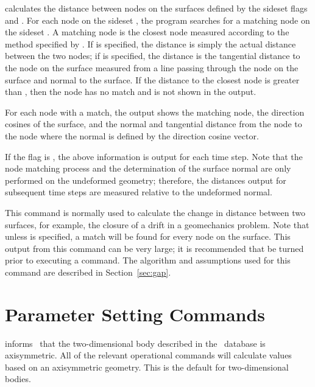  {
 calculates the distance between nodes on the surfaces defined
by the sideset flags  and .  For each
node on the sideset , the program searches for a
matching node on the sideset .  A matching node is
the closest node measured according to the method specified by
.  If  is specified, the
distance is simply the actual distance between the two nodes; if
 is specified, the distance is the tangential distance to
the node on the  surface measured from a line passing
through the node on the  surface and normal to the
surface.  If the distance to the closest  node is
greater than , then the  node has no
match and is not shown in the output.  

For each   node with a match, the output shows the
matching   node, the direction cosines of the surface,
and the normal and tangential distance from the   node
to the   node where the normal is defined by the
direction cosine vector.

If the  flag is , the above information is output
for each time step.  Note that the node matching process and the
determination of the surface normal are only performed on the undeformed
geometry; therefore, the distances output for subsequent time steps are
measured relative to the undeformed normal.  

This command is normally used to calculate the change in distance
between two surfaces, for example, the closure of a drift in a
geomechanics problem.  Note that unless  is specified,
a match will be found for every node on the  surface.
This output from this command can be very large; it is recommended that
 be turned  prior to executing a  command.
The algorithm and assumptions used for this command are described in
Section~\ref{sec:gap}.
}

\section{Parameter Setting Commands}\label{sec:param}

 {
 informs \numbers\ that the two-dimensional body
described in the \EXO\ database is axisymmetric.  All of the relevant
operational commands will calculate values based on an axisymmetric
geometry.  This is the default for two-dimensional bodies.
}

